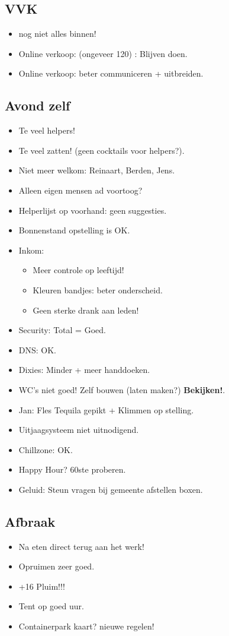 \documentclass[pdftex,12pt,a4paper,english,titlepage]{article}
\begin{document}
\subsection{VVK}
\begin{itemize}
	\item nog niet alles binnen!
	\item Online verkoop: (ongeveer 120) : Blijven doen.
	\item Online verkoop: beter communiceren + uitbreiden.
\end{itemize}

\subsection{Avond zelf}
\begin{itemize}
	\item Te veel helpers!
	\item Te veel zatten! (geen cocktails voor helpers?).
	\item Niet meer welkom: Reinaart, Berden, Jens.
	\item Alleen eigen mensen ad voortoog?
	\item Helperlijst op voorhand: geen suggesties.
	\item Bonnenstand opstelling is OK.
	\item Inkom: 	\begin{itemize}
					\item Meer controle op leeftijd!
					\item Kleuren bandjes: beter onderscheid.
					\item Geen sterke drank aan leden!
					\end{itemize}
	\item Security: Total = Goed.
	\item DNS: OK.
	\item Dixies: Minder + meer handdoeken.
	\item WC's niet goed! Zelf bouwen (laten maken?) \textbf{Bekijken!}.
	\item Jan: Fles Tequila gepikt + Klimmen op stelling.
	\item Uitjaagsysteem niet uitnodigend.
	\item Chillzone: OK.
	\item Happy Hour? 60ste proberen.
	\item Geluid: Steun vragen bij gemeente afstellen boxen.
\end{itemize}

\subsection{Afbraak}
\begin{itemize}
	\item Na eten direct terug aan het werk!
	\item Opruimen zeer goed.
	\item +16 Pluim!!!
	\item Tent op goed uur.
	\item Containerpark kaart? nieuwe regelen!
\end{itemize}
\end{document}
